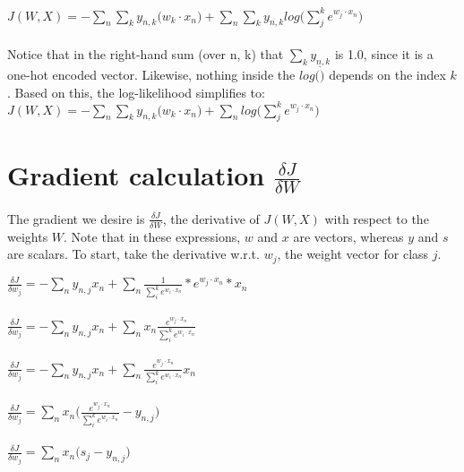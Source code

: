 \documentclass{article}
\begin{document}
$ \boxed{ J(W,X) = - \sum_{n} \sum_{k} y_{n,k}\big(w_{k} \cdot x_{n}\big) + \sum_{n} \sum_{k} y_{n,k} log\big(\sum_{j}^{k} e^{w_{j} \cdot x_{n}}\big) }$ \\ \\

Notice that in the right-hand sum (over n, k) that $\sum_{k} y_{n,k}$ is 1.0, since it is a one-hot encoded vector. Likewise, nothing inside the $log(\dot)$ depends on the index $k$. Based on this, the log-likelihood simplifies to: \\

$ \boxed{ J(W,X) = - \sum_{n} \sum_{k} y_{n,k}\big(w_{k} \cdot x_{n}\big) + \sum_{n} log\big(\sum_{j}^{k} e^{w_{j} \cdot x_{n}}\big) }$ \\


\section{Gradient calculation $\frac{\delta J}{\delta W}$}

The gradient we desire is $\frac{\delta J}{\delta W}$, the derivative of $J(W,X)$ with respect to the weights $W$.
Note that in these expressions, $w$ and $x$ are vectors, whereas $y$ and $s$ are scalars. To start, take the derivative w.r.t. $w_j$, the weight vector for class $j$.

$\frac{\delta J}{\delta w_{j}} = - \sum_{n} y_{n,j} x_{n} + \sum_{n} \frac{1}{\sum_{i}^{k} e^{w_{i} \cdot x_{n}}} * e^{w_j \cdot x_{n}} * x_{n}  $ \\ \\

$\frac{\delta J}{\delta w_{j}} = - \sum_{n} y_{n,j} x_{n} + \sum_{n} x_{n} \frac{e^{w_j \cdot x_{n}}} {\sum_{i}^{k} e^{w_{i} \cdot x_{n}}}  $ \\ \\

$\frac{\delta J}{\delta w_{j}} = - \sum_{n} y_{n,j} x_{n} + \sum_{n} \frac{e^{w_j \cdot x_{n}}} {\sum_{i}^{k} e^{w_{i} \cdot x_{n}}} x_{n} $ \\ \\


$\frac{\delta J}{\delta w_{j}} = \sum_{n} x_{n} \big(\frac{e^{w_j \cdot x_{n}}} {\sum_{i}^{k} e^{w_{i} \cdot x_{n}}} - y_{n,j}\big) $ \\ \\

$\frac{\delta J}{\delta w_{j}} = \sum_{n} x_{n} \big(s_{j} - y_{n,j}\big) $ \\ \\
\end{document}
